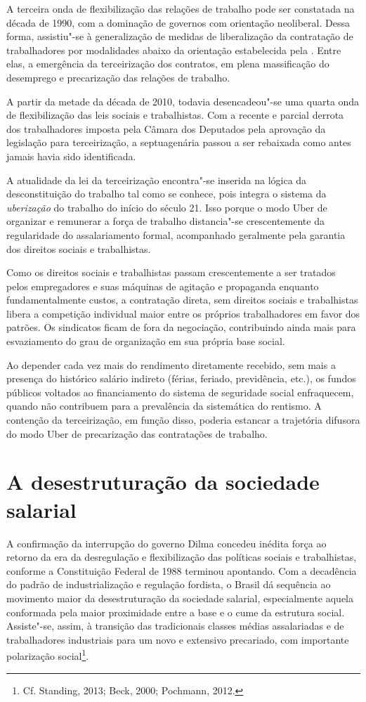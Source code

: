 A terceira onda de flexibilização das relações de trabalho pode ser
constatada na década de 1990, com a dominação de governos com orientação
neoliberal. Dessa forma, assistiu"-se à generalização de medidas de
liberalização da contratação de trabalhadores por modalidades abaixo da
orientação estabelecida pela . Entre elas, a emergência da
terceirização dos contratos, em plena massificação do desemprego e
precarização das relações de trabalho.

A partir da metade da década de 2010, todavia desencadeou"-se uma quarta
onda de flexibilização das leis sociais e trabalhistas. Com a recente e
parcial derrota dos trabalhadores imposta pela Câmara dos Deputados pela
aprovação da legislação para terceirização, a septuagenária  passou a
ser rebaixada como antes jamais havia sido identificada.

A atualidade da lei da terceirização encontra"-se inserida na lógica da
desconstituição do trabalho tal como se conhece, pois integra o sistema
da \emph{uberização} do trabalho do início do século 21. Isso porque o
modo Uber de organizar e remunerar a força de trabalho distancia"-se
crescentemente da regularidade do assalariamento formal, acompanhado
geralmente pela garantia dos direitos sociais e trabalhistas.

Como os direitos sociais e trabalhistas passam crescentemente a ser
tratados pelos empregadores e suas máquinas de agitação e propaganda
enquanto fundamentalmente custos, a contratação direta, sem direitos
sociais e trabalhistas libera a competição individual maior entre os
próprios trabalhadores em favor dos patrões. Os sindicatos ficam de fora
da negociação, contribuindo ainda mais para esvaziamento do grau de
organização em sua própria base social.

Ao depender cada vez mais do rendimento diretamente recebido, sem mais a
presença do histórico salário indireto (férias, feriado, previdência,
etc.), os fundos públicos voltados ao financiamento do sistema de
seguridade social enfraquecem, quando não contribuem para a prevalência
da sistemática do rentismo. A contenção da terceirização, em função
disso, poderia estancar a trajetória difusora do modo Uber de
precarização das contratações de trabalho.

\section{A desestruturação da sociedade salarial}

A confirmação da interrupção do governo Dilma concedeu inédita força ao
retorno da era da desregulação e flexibilização das políticas sociais e
trabalhistas, conforme a Constituição Federal de 1988 terminou
apontando. Com a decadência do padrão de industrialização e regulação
fordista, o Brasil dá sequência ao movimento maior da desestruturação da
sociedade salarial, especialmente aquela conformada pela maior
proximidade entre a base e o cume da estrutura social. Assiste"-se,
assim, à transição das tradicionais classes médias assalariadas e de
trabalhadores industriais para um novo e extensivo precariado, com
importante polarização social\footnote{Cf. Standing, 2013; Beck, 2000; Pochmann,
2012.}.

